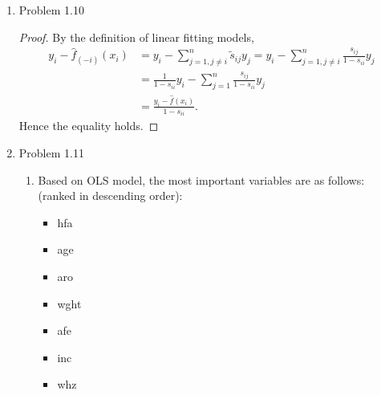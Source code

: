 \documentclass{article}
\begin{document}
\begin{enumerate}
\begin{enumerate}
\item Show that $\lim_{\lambda\to 0^+}\frac{\partial}{\partial \lambda}\text{Bias}^2(\hat\beta) = 0 $.
\begin{proof}
First
$$
\text{MSE}(\hat\beta) = \sum \text{Var}(\hat\beta_j)+\sum\text{Bias}^2(\hat\beta_j).
$$
By (1.17) in https://arxiv.org/pdf/1509.09169;Lecture,
$$
\begin{aligned}
\text{MSE}(\hat\beta) = \sigma^2\text{tr}\{\frac{1}{n}QA^{-1}DA^{-1}Q^\top\} + \beta^\top Q(A^{-1}D-I)^\top (A^{-1}D-I)Q^\top\beta,
\end{aligned}
$$
where $A = D+\frac{1}{n}\lambda I$. By (a) we knowthe first term is just $\text{Var}(\hat\beta)$, so
$$
\begin{aligned}
\text{Bias}^2(\hat\beta) &= \beta^\top Q(A^{-1}D-I)^\top (A^{-1}D-I)Q^\top\beta \\
&= \alpha^\top\text{diag}\{\frac{\frac{1}{n^2}\lambda}{(d_i+\frac{1}{n}\lambda)^2}\}\alpha,
\end{aligned}
$$
where $\alpha = Q^\top\beta $. Then
$$
\begin{aligned}
\lim_{\lambda\to 0^+}\frac{\partial}{\partial\lambda}\text{Bias}^2(\hat\beta) = \lim_{\lambda\to 0^+} \alpha^\top\text{diag}\{\frac{\frac{2}{n^2}\lambda(d_i+\frac{1}{n}\lambda)^2-\frac{2}{n^3}\lambda^2(d_i+\frac{1}{n}\lambda)^2}{(d_i+\frac{1}{n}\lambda)^4}\}\alpha = 0.
\end{aligned}
$$

\end{proof}

\end{enumerate}

\item Problem 1.10
\begin{proof}
By the definition of linear fitting models,
$$
\begin{aligned}
y_i - \hat{f}_{(-i)}(x_i) &= y_i - \sum_{j=1, j\ne i}^{n}\tilde{s}_{ij}y_{j} = y_i - \sum_{j=1, j\ne i}^{n}\frac{s_{ij}}{1-s_{ii}}y_j \\
&= \frac{1}{1-s_{ii}}y_i -\sum_{j=1}^{n}\frac{s_{ij}}{1-s_{ii}}y_j \\
&= \frac{y_i - \hat{f}(x_i)}{1-s_{ii}}.
\end{aligned}
$$
Hence the equality holds.

\end{proof}

\item Problem 1.11

\begin{enumerate}
\item Based on OLS model, the most important variables are as follows: (ranked in descending order): 
\begin{itemize} \itemsep -2pt
\item hfa
\item age
\item aro
\item wght
\item afe
\item inc
\item whz
\end{itemize}


\end{enumerate}
\end{enumerate}
\end{document}
